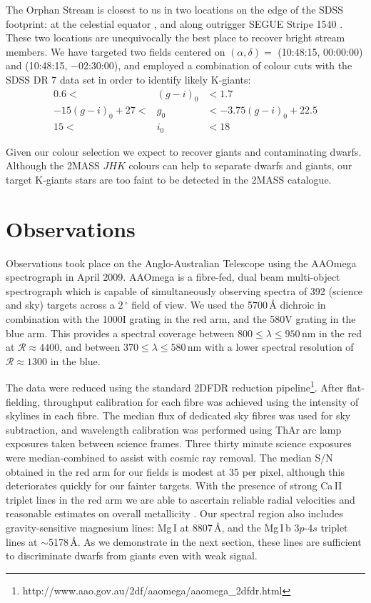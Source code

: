 The Orphan Stream is closest to us in two locations on the edge of the SDSS footprint: at the celestial equator \citep{Belokurov_et-al_2007}, and along outrigger SEGUE Stripe 1540 \citep{Newberg_et-al_2010}. These two locations are unequivocally the best place to recover bright stream members. We have targeted two fields centered on $(\alpha, \delta) =$ (10:48:15, 00:00:00) and (10:48:15, $-$02:30:00), and employed a combination of colour cuts with the SDSS DR 7 \citep{Abazajian_et-al_2009} data set in order to identify likely K-giants:
\begin{eqnarray}
0.6 <& (g-i)_0 &< 1.7 \\
-15(g-i)_0 + 27 <& g_0 &< -3.75(g-i)_0 + 22.5 \\
15  <& i_0  &< 18 
\end{eqnarray}

Given our colour selection we expect to recover giants and contaminating dwarfs. Although the 2MASS $JHK$ colours can help to separate dwarfs and giants, our target K-giants stars are too faint to be detected in the 2MASS catalogue.

\section{Observations}
\label{sec:ch2-observations}

Observations took place on the Anglo-Australian Telescope using the AAOmega spectrograph in April 2009. AAOmega is a fibre-fed, dual beam multi-object spectrograph which is capable of simultaneously observing spectra of 392 (science and sky) targets across a $2\,^\circ$ field of view. We used the 5700\,{\AA} dichroic in combination with the 1000I grating in the red arm, and the 580V grating in the blue arm. This provides a spectral coverage between $800 \leq \lambda \leq 950$\,nm in the red at $\mathcal{R} \approx 4400$, and between $370 \leq \lambda \leq 580$\,nm with a lower spectral resolution of $\mathcal{R} \approx 1300$ in the blue.

The data were reduced using the standard \textsc{2DFDR} reduction pipeline\footnote{http://www.aao.gov.au/2df/aaomega/aaomega\_2dfdr.html}. After flat-fielding, throughput calibration for each fibre was achieved using the intensity of skylines in each fibre. The median flux of dedicated sky fibres was used for sky subtraction, and wavelength calibration was performed using ThAr arc lamp exposures taken between science frames. Three thirty minute science exposures were median-combined to assist with cosmic ray removal. The median S/N obtained in the red arm for our fields is modest at 35 per pixel, although this deteriorates quickly for our fainter targets. With the presence of strong Ca\,\textsc{II} triplet lines in the red arm we are able to ascertain reliable radial velocities and reasonable estimates on overall metallicity \citep[][and references therein]{Starkenburg_et-al_2010}. Our spectral region also includes gravity-sensitive magnesium lines: Mg\,\textsc{I} at 8807\,{\AA}, and the Mg\,\textsc{I}\,b 3$p$-4$s$ triplet lines at $\sim$5178\,{\AA}. As we demonstrate in the next section, these lines are sufficient to discriminate dwarfs from giants even with weak signal.

